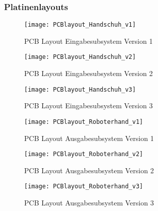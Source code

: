 \documentclass[titlepage,12pt,twoside]{article}
\begin{document}




\subsubsection{Platinenlayouts}
\begin{figure}[H]
	\begin{center}
		\scalebox{1.2}
		{\texttt{[image: PCBlayout\_Handschuh\_v1]}}
		\caption{PCB Layout Eingabesubsystem Version 1}
		\label{fig:PCBlayout_Handschuh_v1}		
	\end{center}
\end{figure}
\pagebreak
\begin{figure}[H]
	\begin{center}
		\scalebox{1.2}
		{\texttt{[image: PCBlayout\_Handschuh\_v2]}}
		\caption{PCB Layout Eingabesubsystem Version 2}
		\label{fig:PCBlayout_Handschuh_v2}		
	\end{center}
\end{figure}
\pagebreak
\begin{figure}[H]
	\begin{center}
		\scalebox{1.2}
		{\texttt{[image: PCBlayout\_Handschuh\_v3]}}
		\caption{PCB Layout Eingabesubsystem Version 3}
		\label{fig:PCBlayout_Handschuh_v3}		
	\end{center}
\end{figure}
\pagebreak
\begin{figure}[H]
	\begin{center}
		\scalebox{1.2}
		{\texttt{[image: PCBlayout\_Roboterhand\_v1]}}
		\caption{PCB Layout Ausgabesubsystem Version 1}
		\label{fig:PCBlayout_Roboterhand_v1}		
	\end{center}
\end{figure}
\pagebreak
\begin{figure}[H]
	\begin{center}
		\scalebox{1.2}
		{\texttt{[image: PCBlayout\_Roboterhand\_v2]}}
		\caption{PCB Layout Ausgabesubsystem Version 2}
		\label{fig:PCBlayout_Roboterhand_v2}		
	\end{center}
\end{figure}
\pagebreak
\begin{figure}[H]
	\begin{center}
		\scalebox{1.2}
		{\texttt{[image: PCBlayout\_Roboterhand\_v3]}}
		\caption{PCB Layout Ausgabesubsystem Version 3}
		\label{fig:PCBlayout_Roboterhand_v3}		
	\end{center}
\end{figure}
\end{document}
